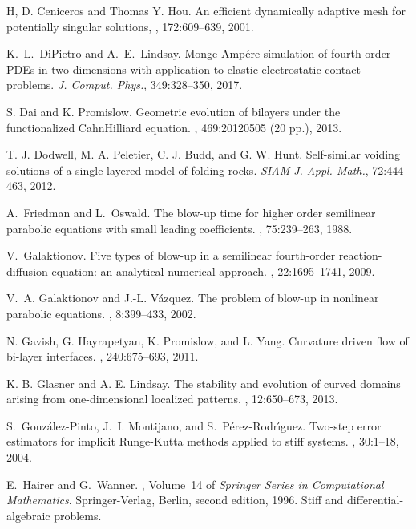 \documentclass{siamart0516}
\theoremstyle{plain}%
\theoremstyle{definition}
\theoremstyle{remark}
\begin{document}
\begin{thebibliography}{10}
H, D. Ceniceros and Thomas Y. Hou.
\newblock An efficient dynamically adaptive mesh for potentially singular solutions,
, 172:609--639, 2001.

 K.~L.~DiPietro and A.~E.~Lindsay.
Monge-Amp\'{e}re simulation of fourth order PDEs in two dimensions with
application to elastic-electrostatic contact problems.
{\em J. Comput. Phys.}, 349:328--350, 2017.

S. Dai and K. Promislow.
\newblock Geometric evolution of bilayers under the functionalized Cahn{\textendash}Hilliard equation.
, 469:20120505 (20 pp.),  2013.

 T. J. Dodwell, M. A. Peletier, C. J. Budd, and G. W. Hunt.
\newblock Self-similar voiding solutions of a single layered model of folding rocks.
{\em SIAM J. Appl. Math.}, 72:444--463, 2012.

A.~Friedman and L.~Oswald.
\newblock The blow-up time for higher order semilinear parabolic equations with
  small leading coefficients.
, 75:239--263, 1988.

V.~Galaktionov.
\newblock Five types of blow-up in a semilinear fourth-order reaction-diffusion
  equation: an analytical-numerical approach.
, 22:1695--1741, 2009.

V.~A. Galaktionov and J.-L. V{\'a}zquez.
\newblock The problem of blow-up in nonlinear parabolic equations.
, 8:399--433, 2002.

N. Gavish, G. Hayrapetyan, K. Promislow, and L. Yang.
\newblock Curvature driven flow of bi-layer interfaces.
, 240:675--693, 2011.

K. B. Glasner and A. E. Lindsay.
\newblock The stability and evolution of curved domains arising from one-dimensional localized patterns.
, 12:650--673, 2013.

S.~Gonz{\'a}lez-Pinto, J.~I. Montijano, and S.~P{\'e}rez-Rodr{\'{\i}}guez.
\newblock Two-step error estimators for implicit {R}unge-{K}utta methods
  applied to stiff systems.
, 30:1--18, 2004.

E.~Hairer and G.~Wanner.
, Volume~14 of
  {\em Springer Series in Computational Mathematics}.
\newblock Springer-Verlag, Berlin, second edition, 1996.
\newblock Stiff and differential-algebraic problems.


\end{thebibliography}
\end{document}
